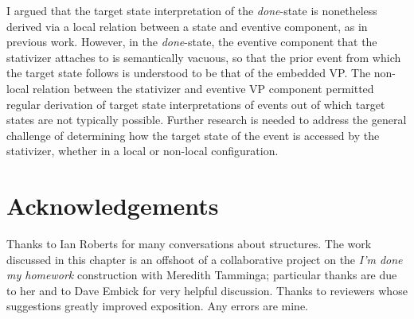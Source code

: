 \documentclass[output=paper]{langsci/langscibook}
\begin{document}
I argued that the target state interpretation of the \emph{done}-state is
nonetheless derived via a local relation between a state and eventive
component, as in previous work. However, in the \emph{done}-state, the eventive
component that the stativizer attaches to is semantically vacuous, so that the
prior event from which the target state follows is understood to be that of the
embedded VP\@. The non-local relation between the stativizer and eventive VP
component permitted regular derivation of target state interpretations of
events out of which target states are not typically possible. Further research
is needed to address the general challenge of determining how the target state
of the event is accessed by the stativizer, whether in a local or non-local
configuration.



\printchapterglossary{}

\section*{Acknowledgements}

Thanks to Ian Roberts for many conversations about  structures. The work
discussed in this chapter is an offshoot of a collaborative project on the
\emph{I'm done my homework} construction with Meredith Tamminga; particular
thanks are due to her and to Dave Embick for very helpful discussion. Thanks to
reviewers whose suggestions greatly improved exposition. Any errors are mine.

{\sloppy
\printbibliography[heading=subbibliography,notkeyword=this]
}
\end{document}
